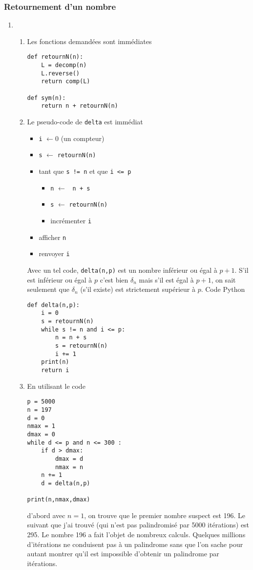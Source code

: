 \subsubsection{Retournement d'un nombre}
\begin{enumerate}
  \item \begin{enumerate}
  \item Les fonctions demandées sont immédiates
\begin{verbatim}
def retournN(n):
    L = decomp(n)
    L.reverse()
    return comp(L)
    
def sym(n):
    return n + retournN(n)
\end{verbatim}
\item Le pseudo-code de \verb|delta| est immédiat
\begin{itemize}
  \item \verb|i| $\longleftarrow 0$ (un compteur)
  \item \verb|s| $\longleftarrow$ \verb|retournN(n)|
  \item tant que \verb|s != n| et que \verb|i <= p|
  \begin{itemize}
    \item \verb|n| $\longleftarrow$ \verb| n + s|
    \item \verb|s| $\longleftarrow$ \verb|retournN(n)|
    \item incrémenter \verb|i|
  \end{itemize}
  \item afficher \verb|n|
  \item renvoyer \verb|i|
\end{itemize}
Avec un tel code, \verb|delta(n,p)| est un nombre inférieur ou égal à $p+1$. S'il est inférieur ou égal à $p$ c'est bien $\delta_n$ mais s'il est égal à $p+1$, on sait seulement que $\delta_n$ (s'il existe) est strictement supérieur à $p$.
Code Python
\begin{verbatim}
def delta(n,p):
    i = 0
    s = retournN(n)
    while s != n and i <= p:
        n = n + s
        s = retournN(n)
        i += 1
    print(n)
    return i
\end{verbatim}
\item En utilisant le code
\begin{verbatim}
p = 5000
n = 197
d = 0
nmax = 1
dmax = 0
while d <= p and n <= 300 :
    if d > dmax:
        dmax = d
        nmax = n
    n += 1
    d = delta(n,p)

print(n,nmax,dmax)
\end{verbatim}
d'abord avec $n=1$, on trouve que le premier nombre suspect est 196. Le suivant que j'ai trouvé (qui n'est pas palindromisé par 5000 itérations) est 295. Le nombre 196 a fait l'objet de nombreux calculs. Quelques millions d'itérations ne conduisent pas à un palindrome sans que l'on sache pour autant montrer qu'il est impossible d'obtenir un palindrome par itérations.
\end{enumerate}

\end{enumerate}
